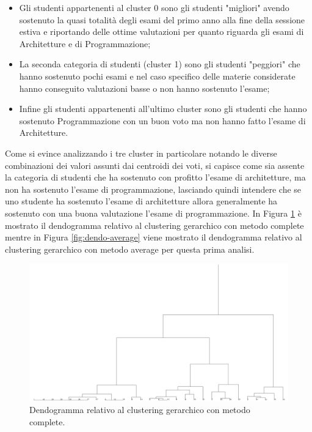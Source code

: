 \documentclass[12pt]{article}
\begin{document}
\begin{itemize}
	\item Gli studenti appartenenti al cluster 0 sono gli studenti "migliori" a\-vendo sostenuto la quasi totalità degli esami del primo anno alla fine della sessione estiva e riportando delle ottime valutazioni per quanto riguarda gli esami di Architetture e di Programmazione;
	\item La seconda categoria di studenti (cluster 1) sono gli studenti "peg\-giori" che hanno sostenuto pochi esami e nel caso specifico delle materie considerate hanno conseguito valutazioni basse o non hanno sostenuto l'esame;
	\item Infine gli studenti appartenenti all'ultimo cluster sono gli studenti che hanno sostenuto Programmazione con un buon voto ma non hanno fatto l'esame di Architetture.
\end{itemize}
Come si evince analizzando i tre cluster in particolare notando le diverse combinazioni dei valori assunti dai centroidi dei voti, si capisce come sia assente la categoria di studenti che ha sostenuto con profitto l'esame di architetture, ma non ha sostenuto l'esame di programmazione,
lasciando quindi intendere che se uno studente ha sostenuto l'esame di architetture allora generalmente ha sostenuto con una buona valutazione l'esame di programmazione.
In Figura \ref{fig:dendo-complete} è mostrato il dendogramma relativo al clustering gerarchico con metodo complete mentre in Figura \ref{fig:dendo-average} viene mostrato il dendogramma relativo al clustering gerarchico con metodo average per questa prima analisi.
\begin{figure}[H]
	\includegraphics[width=\textwidth]{img/hierarchical-complete.png}
	\caption{Dendogramma relativo al clustering gerarchico con metodo complete.}
	\label{fig:dendo-complete}
\end{figure}
\end{document}
